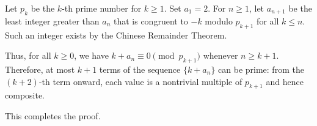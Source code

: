 Let $p_{k}$ be the $k$-th prime number for $k \geq 1$. Set $a_{1} = 2$. For $n \geq 1$, let $a_{n+1}$ be the least integer greater than $a_{n}$ that is congruent to $-k$ modulo $p_{k+1}$ for all $k \leq n$. Such an integer exists by the Chinese Remainder Theorem.

Thus, for all $k \geq 0$, we have $k + a_{n} \equiv 0 \pmod{p_{k+1}}$ whenever $n \geq k+1$. Therefore, at most $k+1$ terms of the sequence $\{k + a_{n}\}$ can be prime: from the $(k+2)$-th term onward, each value is a nontrivial multiple of $p_{k+1}$ and hence composite.

This completes the proof.
